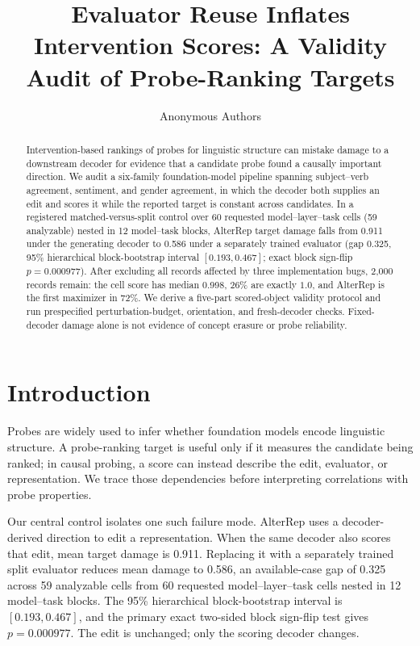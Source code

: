 \documentclass{article}
\title{Evaluator Reuse Inflates Intervention Scores: A Validity Audit of Probe-Ranking Targets}
\author{Anonymous Authors}
\newcommand{\SplitMatched}{0.911}
\newcommand{\SplitIndependent}{0.586}
\newcommand{\SplitGap}{0.325}
\newcommand{\SplitCI}{$[0.193, 0.467]$}
\newcommand{\SplitP}{0.000977}
\newcommand{\BugFilteredN}{2{,}000}
\newcommand{\BugFilteredMedian}{0.998}
\newcommand{\BugFilteredCeiling}{26\%}
\newcommand{\BugFilteredAlterRep}{72\%}
\begin{document}


\maketitle

\begin{abstract}
Intervention-based rankings of probes for linguistic structure can mistake damage to a downstream decoder for evidence that a candidate probe found a causally important direction. We audit a six-family foundation-model pipeline spanning subject--verb agreement, sentiment, and gender agreement, in which the decoder both supplies an edit and scores it while the reported target is constant across candidates. In a registered matched-versus-split control over 60 requested model--layer--task cells (59 analyzable) nested in 12 model--task blocks, AlterRep target damage falls from \SplitMatched{} under the generating decoder to \SplitIndependent{} under a separately trained evaluator (gap \SplitGap{}, 95\% hierarchical block-bootstrap interval \SplitCI{}; exact block sign-flip $p=\SplitP$). After excluding all records affected by three implementation bugs, \BugFilteredN{} records remain: the cell score has median \BugFilteredMedian{}, \BugFilteredCeiling{} are exactly $1.0$, and AlterRep is the first maximizer in \BugFilteredAlterRep{}. We derive a five-part scored-object validity protocol and run prespecified perturbation-budget, orientation, and fresh-decoder checks. Fixed-decoder damage alone is not evidence of concept erasure or probe reliability.
\end{abstract}

\section{Introduction}

Probes are widely used to infer whether foundation models encode linguistic structure. A probe-ranking target is useful only if it measures the candidate being ranked; in causal probing, a score can instead describe the edit, evaluator, or representation. We trace those dependencies before interpreting correlations with probe properties.

Our central control isolates one such failure mode. AlterRep uses a decoder-derived direction to edit a representation. When the same decoder also scores that edit, mean target damage is \SplitMatched{}. Replacing it with a separately trained split evaluator reduces mean damage to \SplitIndependent{}, an available-case gap of \SplitGap{} across 59 analyzable cells from 60 requested model--layer--task cells nested in 12 model--task blocks. The 95\% hierarchical block-bootstrap interval is \SplitCI{}, and the primary exact two-sided block sign-flip test gives $p=\SplitP$. The edit is unchanged; only the scoring decoder changes.
\end{document}
